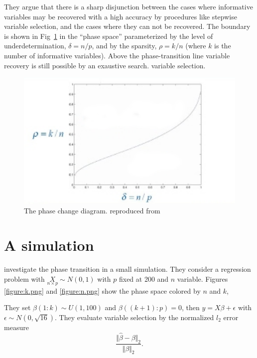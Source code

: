 \documentclass[11pt]{article}
\begin{document}
They argue that there is a sharp disjunction between the cases where informative variables may be recovered with a high
accuracy by procedures like stepwise variable selection, and the cases where they can not be recovered. The boundary is
shown in Fig~\ref{figure:phase-diagram-equivalence.png} in the ``phase space'' parameterized by the level of underdetermination,
$\delta = n/p$, and by the sparsity, $\rho =k/n$ (where $k$ is the number of informative variables).  Above the
phase-transition line variable recovery is still possible by an exaustive search.
variable selection.

\begin{figure}[tbhp] 
    \centering
    \includegraphics[totalheight=6cm,width=12cm]{./figs/phase2.png} %
    \caption{The phase change diagram. reproduced from  }
    \label{figure:phase-diagram-equivalence.png} 
    \vspace{4ex}
\end{figure}

\FloatBarrier
\section{A simulation}
\cite{Donoho.and.Stodden.2006} investigate the phase transition in a small simulation.  They consider a regression
problem with $\underset{n\times p}{X}\sim N(0,1)$ with $p$ fixed at 200 and $n$ variable. Figures \ref{figure:k.png} and
\ref{figure:n.png} show the phase space colored by $n$ and $k$,

They set $\beta(1:k) \sim U(1,100)$ and $\beta((k+1):p) =0$, then $y= X\beta + \epsilon$ with
$\epsilon \sim N(0,\sqrt{16})$. They evaluate variable selection by the normalized $l_2$ error measure
$$\frac{\Vert\hat{\beta}-\beta\Vert_2}{\Vert\beta\Vert_2}.$$
\end{document}
